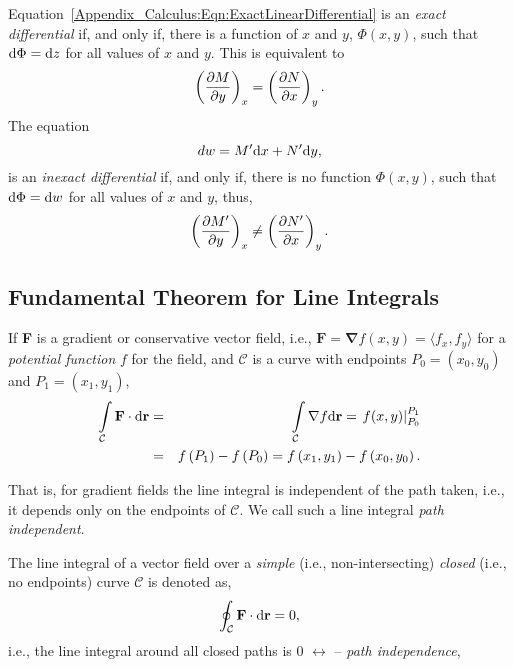 \medskip
Equation~\ref{Appendix_Calculus:Eqn:ExactLinearDifferential} is an {\it exact differential} if, and only if, there is a function of $x$ and $y$, $\Phi(x,y)$, such that $\d{\Phi}=\d{z}$ for all values of $x$ and $y$. This is equivalent to
   \begin{displaymath}
        \Partial[M]{y}{x} = \Partial[N]{x}{y}.
   \end{displaymath}
The equation
   \begin{equation}
      dw = M^{\prime}\d{x} + N^{\prime}\d{y},\label{Appendix_Calculus:Eqn:InexactLinearDifferential}
   \end{equation}
 is an {\it inexact differential} if, and only if, there is no function $\Phi(x,y)$, such that $\d{\Phi}=\d{w}$ for all values of $x$ and $y$, thus,
   \begin{displaymath}
        \Partial[M^{\prime}]{y}{x} \neq \Partial[N^{\prime}]{x}{y}.
   \end{displaymath}

\subsection{Fundamental Theorem for Line Integrals}

\begin{theorem}
   If {\bf F} is a gradient or conservative vector field, i.e., $\mathbf{F}=\mathbf{\nabla}f(x,y)=\langle f_{x}, f_{y}\rangle$ for a {\it potential function} $f$ for the field, and $\mathcal{C}$ is a curve with endpoints $P_{0}=\left(x_{0},y_{0}\right)$ and $P_{1}=\left(x_{1},y_{1}\right)$,
      \begin{eqnarray}
         \int\limits_{\mathcal{C}}\mathbf{F}\cdot\d{\mathbf{r}} &=& \int\limits_{\mathcal{C}}\mathbf{\nabla}f\d{\mathbf{r}} = \left.f(x,y)\right|_{P_{0}}^{P_{1}}\\
                                                           &=& f\left(P_{1}\right)-f\left(P_{0}\right) = f\left(x_{1},y_{1}\right) - f\left(x_{0},y_{0}\right)\nonumber.
      \end{eqnarray}
\end{theorem} 
That is, for gradient fields the line integral is independent of the path taken, i.e., it depends only on the endpoints of $\mathcal{C}$. We call such a line integral {\it path independent}.
\medskip

The line integral of a vector field over a {\it simple} (i.e., non-intersecting) {\it closed} (i.e., no endpoints) curve $\mathcal{C}$ is denoted as,
        \begin{equation}
           \oint_{\mathcal{C}}\mathbf{F}\cdot\d{\mathbf{r}} = 0,
        \end{equation}
i.e., the line integral around all closed paths is 0 $\leftrightarrow$ -- {\it path independence},
